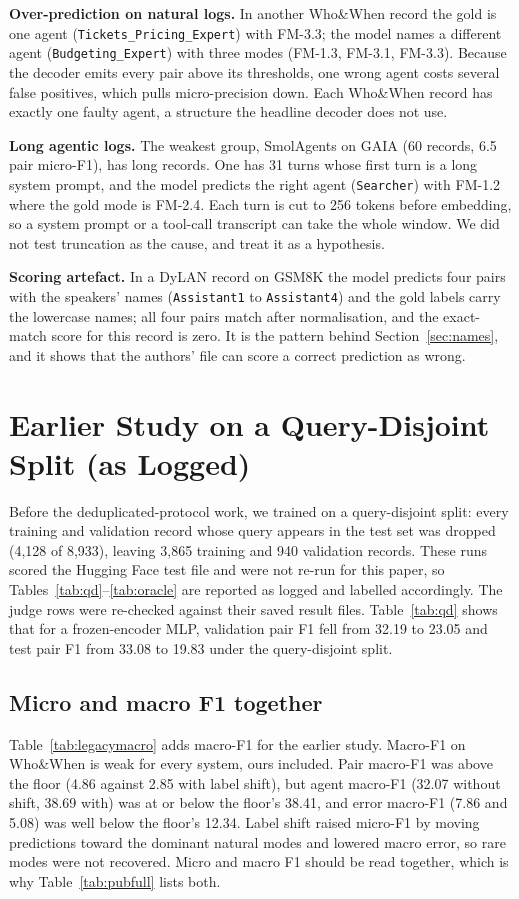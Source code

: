 \documentclass[conference]{IEEEtran}
\begin{document}
\textbf{Over-prediction on natural logs.} In another Who\&When record the gold is one agent (\texttt{Tickets\_Pricing\_Expert}) with FM-3.3; the model names a different agent (\texttt{Budgeting\_Expert}) with three modes (FM-1.3, FM-3.1, FM-3.3). Because the decoder emits every pair above its thresholds, one wrong agent costs several false positives, which pulls micro-precision down. Each Who\&When record has exactly one faulty agent, a structure the headline decoder does not use.

\textbf{Long agentic logs.} The weakest group, SmolAgents on GAIA (60 records, 6.5 pair micro-F1), has long records. One has 31 turns whose first turn is a long system prompt, and the model predicts the right agent (\texttt{Searcher}) with FM-1.2 where the gold mode is FM-2.4. Each turn is cut to 256 tokens before embedding, so a system prompt or a tool-call transcript can take the whole window. We did not test truncation as the cause, and treat it as a hypothesis.

\textbf{Scoring artefact.} In a DyLAN record on GSM8K the model predicts four pairs with the speakers' names (\texttt{Assistant1} to \texttt{Assistant4}) and the gold labels carry the lowercase names; all four pairs match after normalisation, and the exact-match score for this record is zero. It is the pattern behind Section~\ref{sec:names}, and it shows that the authors' file can score a correct prediction as wrong.

\section{Earlier Study on a Query-Disjoint Split (as Logged)}\label{sec:legacy}
Before the deduplicated-protocol work, we trained on a query-disjoint split: every training and validation record whose query appears in the test set was dropped (4,128 of 8,933), leaving 3,865 training and 940 validation records. These runs scored the Hugging Face test file and were not re-run for this paper, so Tables~\ref{tab:qd}--\ref{tab:oracle} are reported as logged and labelled accordingly. The judge rows were re-checked against their saved result files. Table~\ref{tab:qd} shows that for a frozen-encoder MLP, validation pair F1 fell from 32.19 to 23.05 and test pair F1 from 33.08 to 19.83 under the query-disjoint split.



\subsection{Micro and macro F1 together}
Table~\ref{tab:legacymacro} adds macro-F1 for the earlier study. Macro-F1 on Who\&When is weak for every system, ours included. Pair macro-F1 was above the floor (4.86 against 2.85 with label shift), but agent macro-F1 (32.07 without shift, 38.69 with) was at or below the floor's 38.41, and error macro-F1 (7.86 and 5.08) was well below the floor's 12.34. Label shift raised micro-F1 by moving predictions toward the dominant natural modes and lowered macro error, so rare modes were not recovered. Micro and macro F1 should be read together, which is why Table~\ref{tab:pubfull} lists both.
\end{document}
